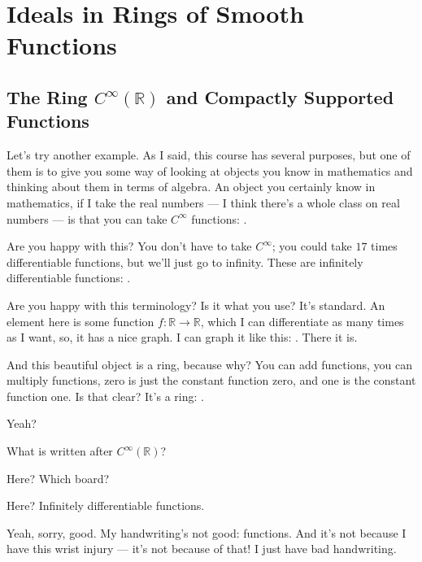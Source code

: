 \section{Ideals in Rings of Smooth Functions}

\subsection{The Ring \texorpdfstring{$C^\infty(\mathbb{R})$}{C-infinity(R)} and Compactly Supported Functions}

\begin{speech}[00:57:05 - 00:58:27]
Let's try another example. As I said, this course has several purposes, but one of them is to give you some way of looking at objects you know in mathematics and thinking about them in terms of algebra. An object you certainly know in mathematics, if I take the real numbers --- I think there's a whole class on real numbers --- is that you can take $C^\infty$ functions: .

Are you happy with this? You don't have to take $C^\infty$; you could take $17$ times differentiable functions, but we'll just go to infinity. These are infinitely differentiable functions: .

Are you happy with this terminology? Is it what you use? It's standard. An element here is some function $f \colon \mathbb{R} \to \mathbb{R}$, which I can differentiate as many times as I want, so, it has a nice graph. I can graph it like this: . There it is.

And this beautiful object is a ring,  because why? You can add functions, you can multiply functions, zero is just the constant function zero, and one is the constant function one. Is that clear? It's a ring: .

Yeah?
\end{speech}

\begin{student}
What is written after $C^\infty(\mathbb{R})$?
\end{student}

\begin{speech}[00:58:27 - 00:58:45]
Here? Which board?

Here? Infinitely differentiable functions.

Yeah, sorry, good. My handwriting's not good: functions. And it's not because I have this wrist injury --- it's not because of that! I just have bad handwriting.
\end{speech}

